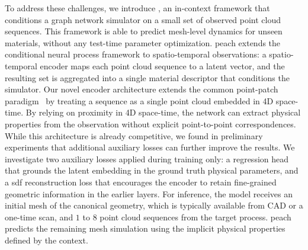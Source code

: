 To address these challenges, we introduce , an in-context framework that conditions a graph network simulator on a small set of observed point cloud sequences.
This framework is able to predict mesh-level dynamics for unseen materials, without any test-time parameter optimization.
\gls{peach} extends the conditional neural process framework \citep{garnelo_conditional_2018} to spatio-temporal observations: a spatio-temporal encoder maps each point cloud sequence to a latent vector, and the resulting set is aggregated into a single material descriptor that conditions the simulator.
Our novel encoder architecture extends the common point-patch paradigm~\citep{pointMAE, pointBERT, pointGPT} by treating a sequence as a single point cloud embedded in 4D space-time.
By relying on proximity in 4D space-time, the network can extract physical properties from the observation without explicit point-to-point correspondences.
While this architecture is already competitive, we found in preliminary experiments that additional auxiliary losses can further improve the results.
We investigate two auxiliary losses applied during training only: a regression head that grounds the latent embedding in the ground truth physical parameters, and a \gls{sdf} reconstruction loss that encourages the encoder to retain fine-grained geometric information in the earlier layers.
For inference, the model receives an initial mesh of the canonical geometry, which is typically available from CAD or a one-time scan, and $1$ to $8$ point cloud sequences from the target process. \gls{peach} predicts the remaining mesh simulation using the implicit physical properties defined by the context.

